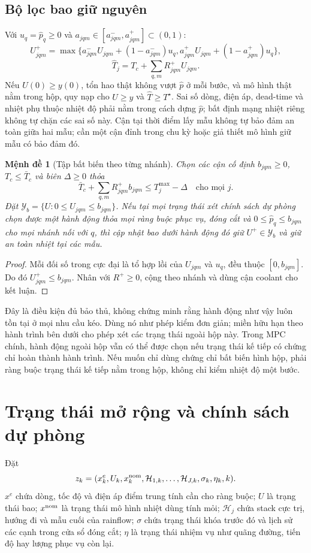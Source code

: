 \documentclass[11pt,a4paper]{article}
\newtheorem{proposition}[theorem]{Mệnh đề}
\begin{document}
\subsection{Bộ lọc bao giữ nguyên}
Với $u_q=\hat p_q\ge0$ và $a_{jqm}\in[a^-_{jqm},a^+_{jqm}]\subset(0,1)$:
\[
U^+_{jqm}=\max\{a^-_{jqm}U_{jqm}+(1-a^-_{jqm})u_q,
 a^+_{jqm}U_{jqm}+(1-a^+_{jqm})u_q\},
\]
\[
\hat T_j=T_c+\sum_{q,m}R^+_{jqm}U_{jqm}.
\]
Nếu $U(0)\ge y(0)$, tổn hao thật không vượt $\hat p$ ở mỗi bước, và mô hình thật nằm trong hộp, quy nạp cho $U\ge y$ và $\hat T\ge T^\star$. Sai số dòng, điện áp, dead-time và nhiệt phụ thuộc nhiệt độ phải nằm trong cách dựng $\hat p$; bất định mạng nhiệt riêng không tự chặn các sai số này. Cận tại thời điểm lấy mẫu không tự bảo đảm an toàn giữa hai mẫu; cần một cận đỉnh trong chu kỳ hoặc giả thiết mô hình giữ mẫu có bảo đảm đó.

\begin{proposition}[Tập bất biến theo từng nhánh]
Chọn các cận cố định $b_{jqm}\ge0$, $T_c\le\bar T_c$ và biên $\Delta\ge0$ thỏa
\[
\bar T_c+\sum_{q,m}R^+_{jqm}b_{jqm}\le T_j^{\max}-\Delta
\quad\text{cho mọi }j.
\]
Đặt $\mathcal Y_b=\{U:0\le U_{jqm}\le b_{jqm}\}$. Nếu tại mọi trạng thái xét chính sách dự phòng chọn được một hành động thỏa mọi ràng buộc phục vụ, đóng cắt và $0\le\hat p_q\le b_{jqm}$ cho mọi nhánh nối với $q$, thì cập nhật bao dưới hành động đó giữ $U^+\in\mathcal Y_b$ và giữ an toàn nhiệt tại các mẫu.
\end{proposition}
\begin{proof}
Mỗi đối số trong cực đại là tổ hợp lồi của $U_{jqm}$ và $u_q$, đều thuộc $[0,b_{jqm}]$. Do đó $U^+_{jqm}\le b_{jqm}$. Nhân với $R^+\ge0$, cộng theo nhánh và dùng cận coolant cho kết luận.
\end{proof}

Đây là điều kiện đủ bảo thủ, không chứng minh rằng hành động như vậy luôn tồn tại ở mọi nhu cầu kéo. Dùng nó như phép kiểm đơn giản; miền hữu hạn theo hành trình bên dưới cho phép xét các trạng thái ngoài hộp này. Trong MPC chính, hành động ngoài hộp vẫn có thể được chọn nếu trạng thái kế tiếp có chứng chỉ hoàn thành hành trình. Nếu muốn chỉ dùng chứng chỉ bất biến hình hộp, phải ràng buộc trạng thái kế tiếp nằm trong hộp, không chỉ kiểm nhiệt độ một bước.

\section{Trạng thái mở rộng và chính sách dự phòng}
Đặt
\[
z_k=(x^e_k,U_k,x^{\rm nom}_k,\mathcal H_{1,k},\ldots,
\mathcal H_{J,k},\sigma_k,\eta_k,k).
\]
$x^e$ chứa dòng, tốc độ và điện áp điểm trung tính cần cho ràng buộc; $U$ là trạng thái bao; $x^{\rm nom}$ là trạng thái mô hình nhiệt dùng tính mỏi; $\mathcal H_j$ chứa stack cực trị, hướng đi và mẫu cuối của rainflow; $\sigma$ chứa trạng thái khóa trước đó và lịch sử các cạnh trong cửa sổ đóng cắt; $\eta$ là trạng thái nhiệm vụ như quãng đường, tiến độ hay lượng phục vụ còn lại.
\end{document}
